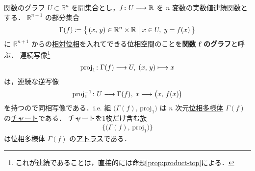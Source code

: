 \documentclass[geometry_main]{subfiles}
\begin{document}
\begin{myexample}[label=ex:graph-of-function]{関数のグラフ}
	$U \subset \mathbb{R}^n$ を開集合とし，$f \colon U \longrightarrow \mathbb{R}$ を $n$ 変数の実数値連続関数とする．
	$\mathbb{R}^{n+1}$ の部分集合
	\begin{align}
		\Gamma(f) \coloneqq \bigl\{\, (x,\, y) \in \mathbb{R}^n \times \mathbb{R} \bigm| x \in U,\; y = f(x) \,\bigr\} 
	\end{align}
	に $\mathbb{R}^{n+1}$ からの\hyperref[def.reltopo]{相対位相}を入れてできる位相空間のことを\textbf{関数 $\bm{f}$ のグラフ}と呼ぶ．
	連続写像\footnote{これが連続であることは，直接的には命題\ref{prop:product-top}による．}
	\begin{align}
		\mathrm{proj}_1 \colon \Gamma(f) \longrightarrow U,\; (x,\, y) \longmapsto x
	\end{align}
	は，連続な逆写像
	\begin{align}
		\mathrm{proj}_1^{-1} \colon U \longrightarrow \Gamma(f),\; x \longmapsto \bigl(x,\, f(x)\bigr)
	\end{align}
	を持つので同相写像である．i.e. 組 $\bigl( \Gamma(f),\, \mathrm{proj}_1 \bigr)$ は $n$ 次元\hyperref[def.topomani]{位相多様体} $\Gamma(f)$ の\hyperref[def.localcoord]{チャート}である．
	チャートを1枚だけ含む族
	\begin{align}
		\bigl\{\bigl( \Gamma(f),\, \mathrm{proj}_1 \bigr)\bigr\}
	\end{align}
	は位相多様体 $\Gamma(f)$ の\hyperref[def.atlas]{アトラス}である．
\end{myexample}
\end{document}

